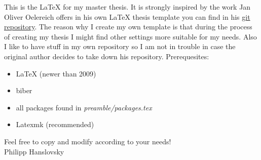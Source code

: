 \label{cha:introduction}

This is the \LaTeX{} for my master thesis. It is strongly inspired by
the work Jan Oliver Oelereich offers in his own \LaTeX{} thesis
template you can find in his
\href{https://github.com/janoliver/LaTeX-thesis-template}{git
    repository}. The reason why I create my own template is that
during the process of creating my thesis I might find other settings
more suitable for my needs. Also I like to have stuff in my own
repository so I am not in trouble in case the original author decides
to take down his repository.
Prerequesites:
\begin{itemize}
      \item \LaTeX{} (newer than 2009)
      \item biber
      \item all packages found in \emph{preamble/packages.tex}
      \item Latexmk (recommended)
\end{itemize}

\vspace{1cm}

Feel free to copy and modify according to your needs! \\
Philipp Hanslovsky

